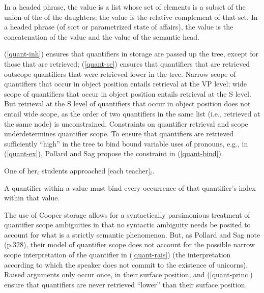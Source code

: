 \documentclass[output=paper]{langsci/langscibook}
\begin{document}
\begin{exe}
\ex\label{quant-princ}
\begin{xlist}
\ex\label{quant-inh}
In a headed phrase, the  value is a list whose set of elements is a subset of the union of the  of the daughters; the  value is the relative complement of that set.
\ex\label{quant-sc}
In a headed phrase (of sort  or parametrized state of affairs), the  value is the concatenation of the  value and the  value of the semantic head.
\end{xlist}
\end{exe} 

(\ref{quant-inh}) ensures that quantifiers in storage are passed up the tree, except for those that are retrieved; (\ref{quant-sc}) ensures that quantifiers that are retrieved outscope quantifiers that were retrieved lower in the tree. Narrow scope of quantifiers that occur in object position entails retrieval at the VP level; wide scope of quantifiers that occur in object position entails retrieval at the S level. But retrieval at the S level of quantifiers that occur in object position does not entail wide scope, as the order of two quantifiers in the same  list (i.e., retrieved at the same node) is unconstrained. Constraints on quantifier retrieval and scope underdetermines quantifier scope. To ensure that quantifiers are retrieved sufficiently ``high'' in the tree to bind bound variable uses of pronouns, e.g.,  in (\ref{quant-ex}), Pollard and Sag propose the constraint in (\ref{quant-bind}).

\begin{exe}
\ex\label{quant-ex}
One of her$_{i}$ students approached [each teacher]$_{i}$. \citep[ex.27a]{ps2}
\end{exe}

\begin{exe}
\ex\label{quant-bind}A quantifier within a  value must bind every occurrence of that quantifier's index within that  value.  
\end{exe}

The use of Cooper storage allows for a syntactically parsimonious treatment of quantifier scope ambiguities in that no syntactic ambiguity needs be posited to account for what is a strictly semantic phenomenon. But, as Pollard and Sag note (p.328), their model of quantifier scope does not account for the possible narrow scope interpretation of the quantifier  in (\ref{quant-rais}) (the interpretation according to which the speaker does not commit to the existence of unicorns). Raised arguments only occur once, in their surface position, and (\ref{quant-princ}) ensure that quantifiers are never retrieved ``lower'' than their surface position.
\end{document}
